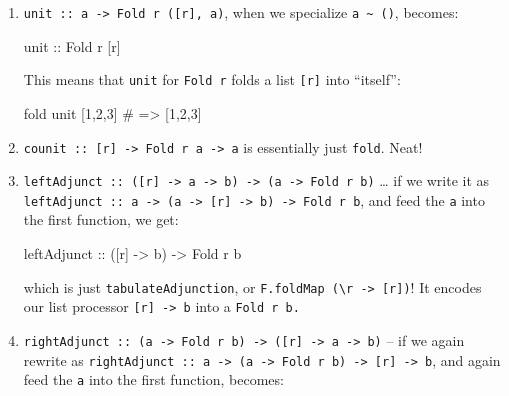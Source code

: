 \documentclass[]{article}
\newenvironment{Shaded}{}{}
\newcommand{\DataTypeTok}[1]{\textcolor[rgb]{0.56,0.13,0.00}{#1}}
\newcommand{\DecValTok}[1]{\textcolor[rgb]{0.25,0.63,0.44}{#1}}
\newcommand{\NormalTok}[1]{#1}
\newcommand{\OtherTok}[1]{\textcolor[rgb]{0.00,0.44,0.13}{#1}}
\newcommand{\PreprocessorTok}[1]{\textcolor[rgb]{0.74,0.48,0.00}{#1}}
\begin{document}
\begin{enumerate}
\def\labelenumi{\arabic{enumi}.}
\item
  \texttt{unit\ ::\ a\ -\textgreater{}\ Fold\ r\ ({[}r{]},\ a)}, when we
  specialize \texttt{a\ \textasciitilde{}\ ()}, becomes:

\begin{Shaded}
\begin{Highlighting}[]
\OtherTok{unit ::} \DataTypeTok{Fold}\NormalTok{ r [r]}
\end{Highlighting}
\end{Shaded}

  This means that \texttt{unit} for \texttt{Fold\ r} folds a list
  \texttt{{[}r{]}} into ``itself'':

\begin{Shaded}
\begin{Highlighting}[]
\NormalTok{fold unit [}\DecValTok{1}\NormalTok{,}\DecValTok{2}\NormalTok{,}\DecValTok{3}\NormalTok{]}
\PreprocessorTok{\#   => [1,2,3]}
\end{Highlighting}
\end{Shaded}
\item
  \texttt{counit\ ::\ {[}r{]}\ -\textgreater{}\ Fold\ r\ a\ -\textgreater{}\ a}
  is essentially just \texttt{fold}. Neat!
\item
  \texttt{leftAdjunct\ ::\ ({[}r{]}\ -\textgreater{}\ a\ -\textgreater{}\ b)\ -\textgreater{}\ (a\ -\textgreater{}\ Fold\ r\ b)}
  \ldots{} if we write it as
  \texttt{leftAdjunct\ ::\ a\ -\textgreater{}\ (a\ -\textgreater{}\ {[}r{]}\ -\textgreater{}\ b)\ -\textgreater{}\ Fold\ r\ b},
  and feed the \texttt{a} into the first function, we get:

\begin{Shaded}
\begin{Highlighting}[]
\OtherTok{leftAdjunct\textquotesingle{} ::}\NormalTok{ ([r] }\OtherTok{{-}>}\NormalTok{ b) }\OtherTok{{-}>} \DataTypeTok{Fold}\NormalTok{ r b}
\end{Highlighting}
\end{Shaded}

  which is just \texttt{tabulateAdjunction}, or
  \texttt{F.foldMap\ (\textbackslash{}r\ -\textgreater{}\ {[}r{]})}! It encodes
  our list processor \texttt{{[}r{]}\ -\textgreater{}\ b} into a
  \texttt{Fold\ r\ b.}
\item
  \texttt{rightAdjunct\ ::\ (a\ -\textgreater{}\ Fold\ r\ b)\ -\textgreater{}\ ({[}r{]}\ -\textgreater{}\ a\ -\textgreater{}\ b)}
  -- if we again rewrite as
  \texttt{rightAdjunct\ ::\ a\ -\textgreater{}\ (a\ -\textgreater{}\ Fold\ r\ b)\ -\textgreater{}\ {[}r{]}\ -\textgreater{}\ b},
  and again feed the \texttt{a} into the first function, becomes:


\end{enumerate}
\end{document}
